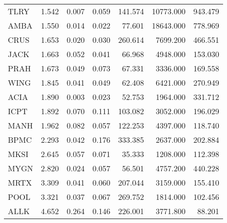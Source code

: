 \begin{table}
\begin{tabular}{lrrrrrr}
TLRY   &       1.542 &     0.007 &    0.059 & 141.574 & 10773.000 &  943.479 \\
AMBA   &       1.550 &     0.014 &    0.022 &  77.601 & 18643.000 &  778.969 \\
CRUS   &       1.653 &     0.020 &    0.030 & 260.614 &  7699.200 &  466.551 \\
JACK   &       1.663 &     0.052 &    0.041 &  66.968 &  4948.000 &  153.030 \\
PRAH   &       1.673 &     0.049 &    0.073 &  67.331 &  3336.000 &  169.558 \\
WING   &       1.845 &     0.041 &    0.049 &  62.408 &  6421.000 &  270.949 \\
ACIA   &       1.890 &     0.003 &    0.023 &  52.753 &  1964.000 &  331.712 \\
ICPT   &       1.892 &     0.070 &    0.111 & 103.082 &  3052.000 &  196.029 \\
MANH   &       1.962 &     0.082 &    0.057 & 122.253 &  4397.000 &  118.740 \\
BPMC   &       2.293 &     0.042 &    0.176 & 333.385 &  2637.000 &  202.884 \\
MKSI   &       2.645 &     0.057 &    0.071 &  35.333 &  1208.000 &  112.398 \\
MYGN   &       2.820 &     0.024 &    0.057 &  56.501 &  4757.200 &  440.228 \\
MRTX   &       3.309 &     0.041 &    0.060 & 207.044 &  3159.000 &  155.410 \\
POOL   &       3.321 &     0.037 &    0.067 & 269.752 &  1814.000 &  102.456 \\
ALLK   &       4.652 &     0.264 &    0.146 & 226.001 &  3771.800 &   88.201 \\
\bottomrule
\end{tabular}
\end{table}


